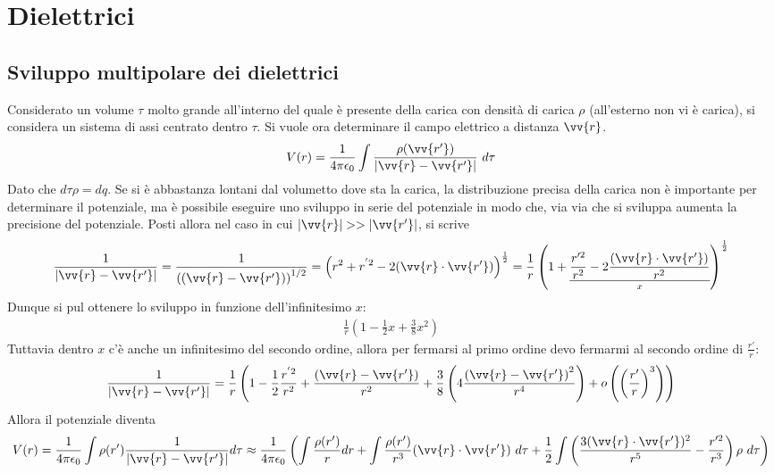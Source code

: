 \documentclass[a4paper, oneside]{article}
\begin{document}
\section{Dielettrici}
\subsection{Sviluppo multipolare dei dielettrici}
Considerato un volume $\tau$ molto grande all'interno del quale è presente
della carica con densità di carica $\rho$ (all'esterno non vi è carica),
si considera un sistema di assi centrato dentro $\tau$. Si vuole ora
determinare il campo elettrico a distanza $\vv{r}$. 
\begin{gather*}
    V(r) = \frac{1}{4\pi\epsilon_0} \int \frac{\rho(\vv{r'} )}{\left| \vv{r} - \vv{r'}   \right| } \ d\tau
\end{gather*} 
Dato che $d\tau \rho = dq$. Se si è abbastanza lontani dal volumetto dove sta la carica, 
la distribuzione precisa della carica non è importante per determinare il 
potenziale, ma è possibile eseguire uno sviluppo in serie del potenziale in modo che, 
via via che si sviluppa aumenta la precisione del potenziale. Posti 
allora nel caso in cui $\left| \vv{r}  \right|  >> \left| \vv{r'}  \right|$, si scrive
\begin{gather*}
    \frac{1}{\left| \vv{r} -\vv{r'}   \right| } = \frac{1}{\left((\vv{r} - \vv{r'}  ) \right)^{1/2}} = \left(r^{2} + r^{'2} - 2(\vv{r}\cdot \vv{r'}  )\right)^{\frac{1}{2}} = \frac{1}{r} \left(1 + \underset{x}{\underline{\frac{r'^{2}}{r^{2}} - 2\frac{(\vv{r} \cdot \vv{r'}  )}{r^{2}}}}\right)^{\frac{1}{2}}
\end{gather*}
Dunque si pul ottenere lo sviluppo in funzione dell'infinitesimo $x$:
\begin{gather*}
    \frac{1}{r}\left(1 - \frac{1}{2}x  + \frac{3}{8}x^{2}\right)
\end{gather*}
Tuttavia dentro $x$ c'è anche un infinitesimo del secondo ordine, allora per fermarsi al primo ordine devo 
fermarmi al secondo ordine di $\frac{r'}{r}$:
\begin{gather*}
    \frac{1}{\left| \vv{r} - \vv{r'}   \right| } = \frac{1}{r}\left(1 - \frac{1}{2} \frac{r^{'2}}{r^{2}} + \frac{(\vv{r} -\vv{r'}  )}{r^{2}} + \frac{3}{8} \left(4\frac{\left(\vv{r} - \vv{r'}  \right)^{2}}{r^{4}}\right) + o\left(\left(\frac{r'}{r}\right)^{3}\right)\right)
\end{gather*}
Allora il potenziale diventa
\begin{gather*}
    V(r) = \frac{1}{4\pi\epsilon_0} \int \rho(r') \frac{1}{\left| \vv{r} -\vv{r'}   \right| } d\tau \approx \frac{1}{4\pi \epsilon_0}\left(\int \frac{\rho(r')}{r} dr  + \int \frac{\rho(r')}{r^{3}} (\vv{r} \cdot \vv{r'}  ) \ d\tau + \frac{1}{2} \int \left(\frac{3(\vv{r}\cdot \vv{r'}  )^{2}}{r^{5}} - \frac{r'^{2}}{r^{3}}\right) \rho \ d\tau  \right) 
\end{gather*}
\end{document}
